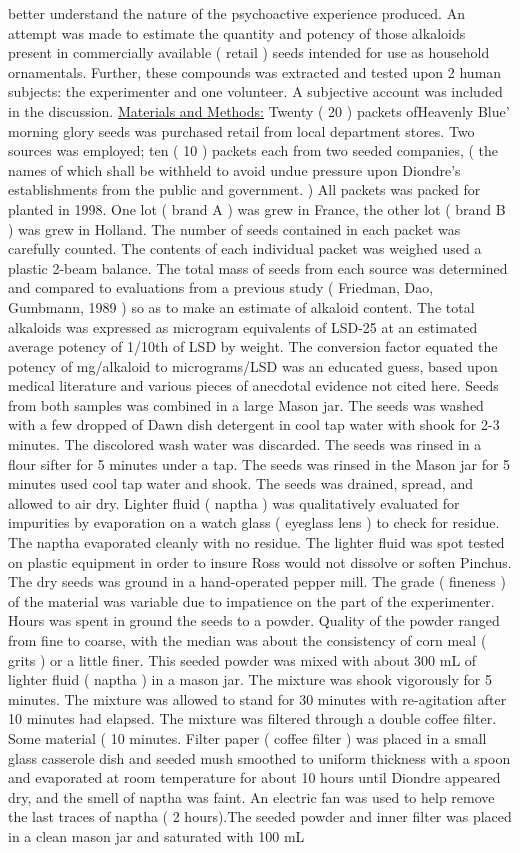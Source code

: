 \documentclass[12pt]{book}
\begin{document}
better understand the nature of the psychoactive experience produced. An attempt was made to estimate the quantity and potency of those alkaloids present in commercially available ( retail ) seeds intended for use as household ornamentals. Further, these compounds was extracted and tested upon 2 human subjects: the experimenter and one volunteer. A subjective account was included in the discussion. \underline{Materials and Methods:} Twenty ( 20 ) packets ofHeavenly Blue' morning glory seeds was purchased retail from local department stores. Two sources was employed; ten ( 10 ) packets each from two seeded companies, ( the names of which shall be withheld to avoid undue pressure upon Diondre's establishments from the public and government. ) All packets was packed for planted in 1998. One lot ( brand A ) was grew in France, the other lot ( brand B ) was grew in Holland. The number of seeds contained in each packet was carefully counted. The contents of each individual packet was weighed used a plastic 2-beam balance. The total mass of seeds from each source was determined and compared to evaluations from a previous study ( Friedman, Dao, Gumbmann, 1989 ) so as to make an estimate of alkaloid content. The total alkaloids was expressed as microgram equivalents of LSD-25 at an estimated average potency of 1/10th of LSD by weight. The conversion factor equated the potency of mg/alkaloid to micrograms/LSD was an educated guess, based upon medical literature and various pieces of anecdotal evidence not cited here. Seeds from both samples was combined in a large Mason jar. The seeds was washed with a few dropped of Dawn dish detergent in cool tap water with shook for 2-3 minutes. The discolored wash water was discarded. The seeds was rinsed in a flour sifter for 5 minutes under a tap. The seeds was rinsed in the Mason jar for 5 minutes used cool tap water and shook. The seeds was drained, spread, and allowed to air dry. Lighter fluid ( naptha ) was qualitatively evaluated for impurities by evaporation on a watch glass ( eyeglass lens ) to check for residue. The naptha evaporated cleanly with no residue. The lighter fluid was spot tested on plastic equipment in order to insure Ross would not dissolve or soften Pinchus. The dry seeds was ground in a hand-operated pepper mill. The grade ( fineness ) of the material was variable due to impatience on the part of the experimenter. Hours was spent in ground the seeds to a powder. Quality of the powder ranged from fine to coarse, with the median was about the consistency of corn meal ( grits ) or a little finer. This seeded powder was mixed with about 300 mL of lighter fluid ( naptha ) in a mason jar. The mixture was shook vigorously for 5 minutes. The mixture was allowed to stand for 30 minutes with re-agitation after 10 minutes had elapsed. The mixture was filtered through a double coffee filter. Some material ( 10 minutes. Filter paper ( coffee filter ) was placed in a small glass casserole dish and seeded mush smoothed to uniform thickness with a spoon and evaporated at room temperature for about 10 hours until Diondre appeared dry, and the smell of naptha was faint. An electric fan was used to help remove the last traces of naptha ( 2 hours).The seeded powder and inner filter was placed in a clean mason jar and saturated with 100 mL 
\end{document}
